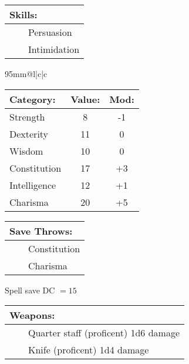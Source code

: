 \documentclass[11pt]{article}
\newcommand{\tabitem}{~~\llap{--}~~}
\begin{document}
\begin{multicols}{2}
\vspace{2mm}

\noindent \begin{tabularx}{95mm}{@{}l}
{\Large \textbf{Skills:}} \\
\hline
\tabitem Persuasion \\
\tabitem Intimidation \\
		\end{tabularx}

\vspace{4mm}

\noindent \begin{tabularx}{95mm}{@{}l|c|c}
 \\
\hline
		\end{tabularx}
\noindent \begin{tabular}{@{}l|c|c}
\textbf{Category:} 			& \textbf{Value:} 	& \textbf{Mod:} \\
\hline
Strength 					& 8 				& -1 			\\
Dexterity 					& 11 				& 0 			\\
Wisdom 						& 10				& 0 			\\
Constitution 				& 17 				& +3 			\\
Intelligence 				& 12 				& +1 			\\
Charisma 					& 20 				& +5 			\\
		\end{tabular}

\vspace{4mm}

\noindent \begin{tabularx}{95mm}{@{}l}
{\Large \textbf{Save Throws:}} \\
\hline
\tabitem Constitution \\
\tabitem Charisma \\
		\end{tabularx}
\noindent Spell save DC $= 15$

\vspace{4mm}

\noindent \begin{tabularx}{95mm}{@{}l}
{\Large \textbf{Weapons:}} \\
\hline
\tabitem Quarter staff (proficent) 1d6 damage \\
\tabitem Knife (proficent) 1d4 damage \\
		\end{tabularx}

\vspace{4mm}


\end{multicols}
\end{document}

